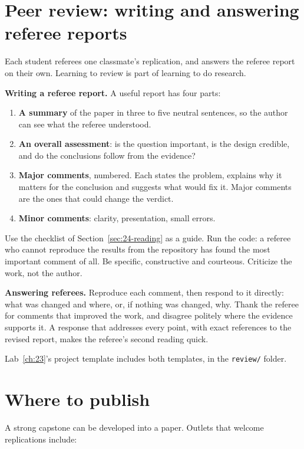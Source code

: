 \section{Peer review: writing and answering referee reports}
\label{sec:24-review}

Each student referees one classmate's replication, and answers the referee report on their own. Learning to review is part of learning to do research.

\textbf{Writing a referee report.} A useful report has four parts:

\begin{enumerate}
  \item \textbf{A summary} of the paper in three to five neutral sentences, so the author can see what the referee understood.
  \item \textbf{An overall assessment}: is the question important, is the design credible, and do the conclusions follow from the evidence?
  \item \textbf{Major comments}, numbered. Each states the problem, explains why it matters for the conclusion and suggests what would fix it. Major comments are the ones that could change the verdict.
  \item \textbf{Minor comments}: clarity, presentation, small errors.
\end{enumerate}

Use the checklist of Section~\ref{sec:24-reading} as a guide. Run the code: a referee who cannot reproduce the results from the repository has found the most important comment of all. Be specific, constructive and courteous. Criticize the work, not the author.

\textbf{Answering referees.} Reproduce each comment, then respond to it directly: what was changed and where, or, if nothing was changed, why. Thank the referee for comments that improved the work, and disagree politely where the evidence supports it. A response that addresses every point, with exact references to the revised report, makes the referee's second reading quick.

Lab~\ref{ch:23}'s project template includes both templates, in the \texttt{review/} folder.

\section{Where to publish}
\label{sec:24-publish}

A strong capstone can be developed into a paper. Outlets that welcome replications include:

